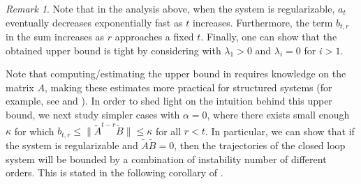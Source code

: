 \documentclass[journal]{IEEEtran}
\theoremstyle{definition}
\theoremstyle{remark}
\newtheorem{remark}{Remark}
\newcommand\x{{\bm x}}
\newcommand\z{{\bm z}}
\begin{document}
	\begin{remark}
	    \label{rmk:bound_behavior}
	    Note that in the analysis above, when the system is regularizable, $a_t$ eventually decreases exponentially fast as $t$ increases.
	    Furthermore, the term $b_{t,r}$ in the sum increases as $r$ approaches a fixed $t$.
		Finally, one can show that the obtained upper bound is tight by considering  with $\lambda_1>0$ and $\lambda_i = 0$ for $i>1$.
	\end{remark}{}
    {\color{Blue}
	Note that computing/estimating the upper bound in  requires knowledge on the matrix $A$, making these estimates more practical for structured systems (for example, see  and ).
    }
	In order to shed light on the intuition behind this upper bound, we next study simpler cases {with $\alpha = 0$,} where there exists small enough $\kappa$ for which
	$b_{t,r} \leq \|\widetilde{A}^{t-r}\widetilde{B}\| \leq \kappa$ for all $r<t$.
	In particular, we can show that if the system is regularizable and $\widetilde{A}\widetilde{B}= 0$, then the trajectories of the closed loop system
	will be bounded by a combination of instability number of different orders. 
	This is stated in the following corollary of .
	
\end{document}
